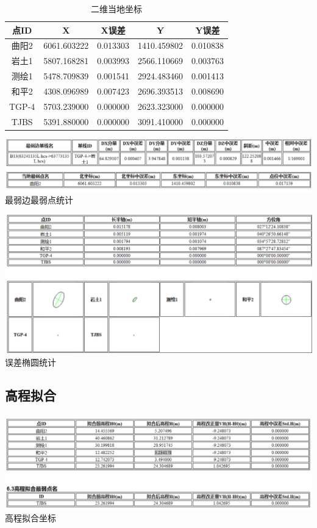 \documentclass[a4paper,16pt,UTF8]{article}
\begin{document}
\begin{center}
    \begin{longtable}{|c|c|c|c|c|}
        \caption{二维当地坐标} \\ \hline
        点ID   & X & X误差 & Y & Y误差 \\ \hline
        曲阳2   & 6061.603222  & 0.013303  & 1410.459802  & 0.010838  \\ \hline
        岩土1   & 5807.168281  & 0.003993  & 2566.110669  & 0.003763  \\ \hline
        测绘1   & 5478.709839  & 0.001541  & 2924.483460  & 0.001413  \\ \hline
        和平2   & 4308.096989  & 0.007423  & 2696.393513  & 0.008690  \\ \hline
        TGP-4 & 5703.239000  & 0.000000  & 2623.323000  & 0.000000  \\ \hline
        TJBS  & 5391.880000  & 0.000000  & 3091.410000  & 0.000000  \\ \hline
        \end{longtable}

        \includegraphics[scale = 0.55]{cgo7.png}
        最弱边最弱点统计

        \includegraphics[scale = 0.55]{cgo8.png}
        误差椭圆统计
\end{center}


\subsection{\Large 高程拟合}

\begin{center}
    \includegraphics[scale = 0.55]{cgo9.png}
    高程拟合坐标
\end{center}
\end{document}
